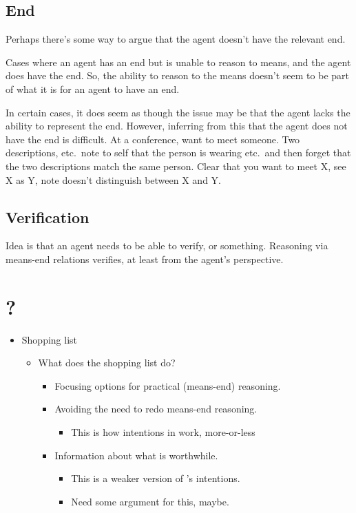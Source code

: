 \documentclass[10pt]{article}
\begin{document}
\subsection{End}
\label{sec:end}

Perhaps there's some way to argue that the agent doesn't have the relevant end.

Cases where an agent has an end but is unable to reason to means, and the agent does have the end.
So, the ability to reason to the means doesn't seem to be part of what it is for an agent to have an end.

In certain cases, it does seem as though the issue may be that the agent lacks the ability to represent the end.
However, inferring from this that the agent does not have the end is difficult.
At a conference, want to meet someone.
Two descriptions, etc.\ note to self that the person is wearing etc.\ and then forget that the two descriptions match the same person.
Clear that you want to meet X, see X as Y, note doesn't distinguish between X and Y.


\subsection{Verification}
\label{sec:verification}

Idea is that an agent needs to be able to verify, or something.
Reasoning via means-end relations verifies, at least from the agent's perspective.



\section{?}

\begin{itemize}
\item Shopping list
  \begin{itemize}
  \item What does the shopping list do?
    \begin{itemize}
    \item Focusing options for practical (means-end) reasoning.
    \item Avoiding the need to redo means-end reasoning.
      \begin{itemize}
      \item This is how intentions in \textcite{Bratman:1987aa} work, more-or-less
      \end{itemize}
    \item Information about what is worthwhile.
      \begin{itemize}
      \item This is a weaker version of \citeauthor{Bratman:1987aa}'s intentions.
      \item Need some argument for this, maybe.
      \end{itemize}
    \end{itemize}
  \end{itemize}
\end{itemize}
\end{document}
